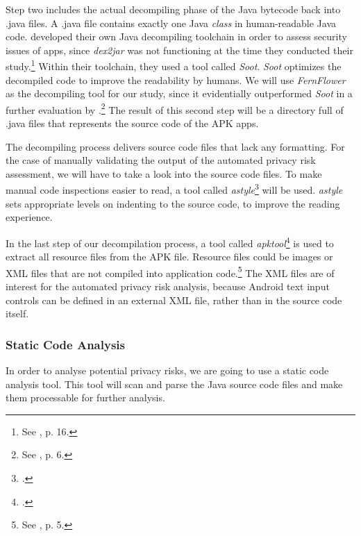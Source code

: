 \documentclass[
	a4paper,
	oneside,
	12pt,
	liststotocnumbered
]{article}
\let\cite\textcite
\begin{document}
Step two includes the actual decompiling phase of the Java bytecode back into .java files. 
A .java file contains exactly one Java \textit{class} in human-readable Java code. 
\cite{Enck2011} developed their own Java decompiling toolchain in order to assess security issues of \mH apps, since \textit{dex2jar} was not functioning at the time they conducted their study.\footnote{See \cite{Enck2011}, p. 16.}
Within their toolchain, they used a tool called \textit{Soot}.
\textit{Soot} optimizes the decompiled code to improve the readability by humans.
We will use \textit{FernFlower} as the decompiling tool for our study, since it evidentially outperformed \textit{Soot} in a further evaluation by \cite{Enck2011}.\footnote{See \cite{Enck2011}, p. 6.}
The result of this second step will be a directory full of .java files that represents the source code of the \acs{APK} apps.

The decompiling process delivers source code files that lack any formatting.
For the case of manually validating the output of the automated privacy risk assessment, we will have to take a look into the source code files. 
To make manual code inspections easier to read, a tool called \textit{astyle}\footnote{\cite{Davidson2006}.} will be used. 
\textit{astyle} sets appropriate levels on indenting to the source code, to improve the reading experience.

In the last step of our decompilation process, a tool called \textit{apktool}\footnote{\cite{Tumbleson2010}.} is used to extract all resource files from the \acs{APK} file. Resource files could be images or XML files that are not compiled into application code.\footnote{See \cite{xu2013}, p. 5.}
The XML files are of interest for the automated privacy risk analysis, because Android text input controls can be defined in an external XML file, rather than in the source code itself.

\subsubsection{Static Code Analysis}
In order to analyse potential privacy risks, we are going to use a static code analysis tool.
This tool will scan and parse the Java source code files and make them processable for further analysis.
\end{document}
